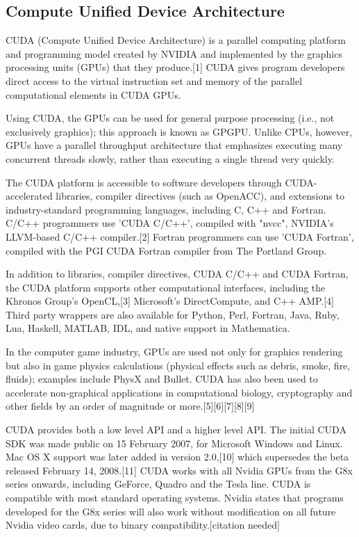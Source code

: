 \subsection*{Compute Unified Device Architecture}

CUDA (Compute Unified Device Architecture) is a parallel computing platform and programming model created by NVIDIA and implemented by the graphics processing units (GPUs) that they produce.[1] CUDA gives program developers direct access to the virtual instruction set and memory of the parallel computational elements in CUDA GPUs.
 
Using CUDA, the GPUs can be used for general purpose processing (i.e., not exclusively graphics); this approach is known as GPGPU. Unlike CPUs, however, GPUs have a parallel throughput architecture that emphasizes executing many concurrent threads slowly, rather than executing a single thread very quickly.
 
The CUDA platform is accessible to software developers through CUDA-accelerated libraries, compiler directives (such as OpenACC), and extensions to industry-standard programming languages, including C, C++ and Fortran. C/C++ programmers use 'CUDA C/C++', compiled with "nvcc", NVIDIA's LLVM-based C/C++ compiler.[2] Fortran programmers can use 'CUDA Fortran', compiled with the PGI CUDA Fortran compiler from The Portland Group.
 
In addition to libraries, compiler directives, CUDA C/C++ and CUDA Fortran, the CUDA platform supports other computational interfaces, including the Khronos Group's OpenCL,[3] Microsoft's DirectCompute, and C++ AMP.[4] Third party wrappers are also available for Python, Perl, Fortran, Java, Ruby, Lua, Haskell, MATLAB, IDL, and native support in Mathematica.
 
In the computer game industry, GPUs are used not only for graphics rendering but also in game physics calculations (physical effects such as debris, smoke, fire, fluids); examples include PhysX and Bullet. CUDA has also been used to accelerate non-graphical applications in computational biology, cryptography and other fields by an order of magnitude or more.[5][6][7][8][9]
 
CUDA provides both a low level API and a higher level API. The initial CUDA SDK was made public on 15 February 2007, for Microsoft Windows and Linux. Mac OS X support was later added in version 2.0,[10] which supersedes the beta released February 14, 2008.[11] CUDA works with all Nvidia GPUs from the G8x series onwards, including GeForce, Quadro and the Tesla line. CUDA is compatible with most standard operating systems. Nvidia states that programs developed for the G8x series will also work without modification on all future Nvidia video cards, due to binary compatibility.[citation needed]



